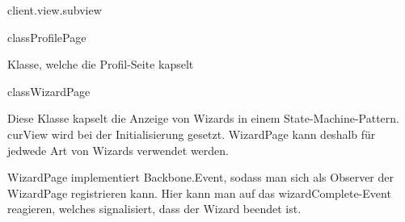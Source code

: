 \begin{texdocpackage}{client.view.subview}
\begin{texdocclass}{class}{ProfilePage}
\label{texdoclet:edu.kit.informatik.studyplan.client.view.subview.ProfilePage}
\begin{texdocclassintro}
Klasse, welche die Profil-Seite kapselt\end{texdocclassintro}
\begin{texdocclassfields}
\end{texdocclassfields}
\begin{texdocclassconstructors}
\end{texdocclassconstructors}
\begin{texdocclassmethods}
\end{texdocclassmethods}
\end{texdocclass}


\begin{texdocclass}{class}{WizardPage}
\label{texdoclet:edu.kit.informatik.studyplan.client.view.subview.WizardPage}
\begin{texdocclassintro}
Diese Klasse kapselt die Anzeige von Wizards in einem State-Machine-Pattern.
 curView wird bei der Initialisierung gesetzt. WizardPage kann deshalb für
 jedwede Art von Wizards verwendet werden.\texdocbr{}

 WizardPage implementiert Backbone.Event, sodass man sich als Observer der
 WizardPage registrieren kann. Hier kann man auf das wizardComplete-Event
 reagieren, welches signalisiert, dass der Wizard beendet ist.\end{texdocclassintro}
\begin{texdocclassfields}
\end{texdocclassfields}
\begin{texdocclassfields}
\end{texdocclassfields}
\begin{texdocclassconstructors}
\end{texdocclassconstructors}
\begin{texdocclassmethods}
\end{texdocclassmethods}
\end{texdocclass}



\end{texdocpackage}
